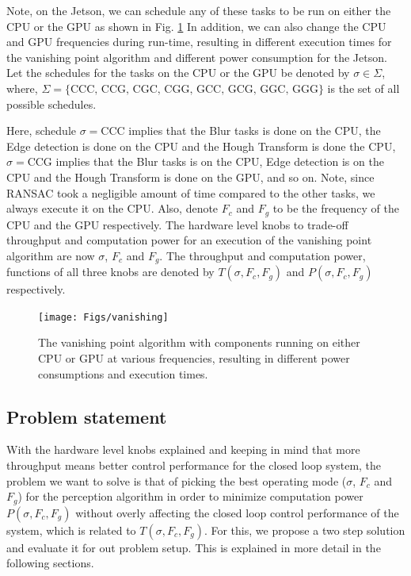 Note, on the Jetson, we can schedule any of these tasks to be run on either the CPU or the GPU as shown in Fig. \ref{fig:vanishing} In addition, we can also change the CPU and GPU frequencies during run-time, resulting in different execution times for the vanishing point algorithm and different power consumption for the Jetson. Let the schedules for the tasks on the CPU or the GPU be denoted by $\sigma\in\Sigma$, where, $\Sigma=\{\text{CCC, CCG, CGC, CGG, GCC, GCG, GGC, GGG}\}$ is the set of all possible schedules.

Here, schedule $\sigma=\text{CCC}$ implies that the Blur tasks is done on the CPU, the Edge detection is done on the CPU and the Hough Transform is done the CPU, $\sigma=\text{CCG}$ implies that the Blur tasks is on the CPU, Edge detection is on the CPU and the Hough Transform is done on the GPU, and so on. Note, since RANSAC took a negligible amount of time compared to the other tasks, we always execute it on the CPU.
Also, denote $F_c$ and $F_g$ to be the frequency of the CPU and the GPU respectively. The hardware level knobs to trade-off throughput and computation power for an execution of the vanishing point algorithm are now $\sigma$, $F_c$ and $F_g$. The throughput and computation power, functions  of all three knobs are denoted by $T(\sigma,F_c,F_g)$ and $P(\sigma,F_c,F_g)$ respectively.

\begin{figure}
	\centering
	\texttt{[image: Figs/vanishing]}
	\caption{The vanishing point algorithm with components running on either CPU or GPU at various frequencies, resulting in different power consumptions and execution times.}
	\label{fig:vanishing}		
\end{figure}

\subsection{Problem statement}
With the hardware level knobs explained and keeping in mind that more throughput means better control performance for the closed loop system, the problem we want to solve is that of picking the best operating mode ($\sigma$, $F_c$ and $F_g$) for the perception algorithm in order to minimize computation power $P(\sigma,F_c,F_g)$ without overly affecting the closed loop control performance of the system, which is related to $T(\sigma,F_c,F_g)$. For this, we propose a two step solution and evaluate it for out problem setup. This is explained in more detail in the following sections.


